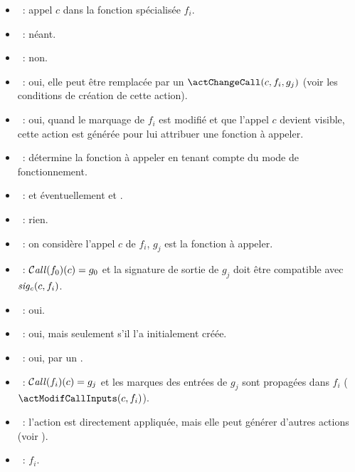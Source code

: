 
\begin{itemize}
  \item \param~: appel $c$ dans la fonction spécialisée $f_i$.
  \item \precond~: néant.
  \item \creable~: non.
  \item \modifiable~: oui, elle peut être remplacée par un $\actChangeCall(c,
    f_i, g_j)$ (voir les conditions de création de cette action).
  \item \generable~: oui, quand le marquage de $f_i$ est modifié et que 
    l'appel $c$ devient visible, cette action est générée pour lui
    attribuer une fonction à appeler.
  \item \application~: détermine la fonction à appeler en tenant compte du mode
    de fonctionnement.
  \item \genere~: \actChangeCall{} et éventuellement \actNewSlice{} et
    \actAddOutputMarks{}.
  \item \modifie~: rien.
\end{itemize}


\begin{itemize}
  \item \param~: on considère l'appel $c$ de $f_i$, $g_j$ est la fonction à
    appeler.
  \item \precond~: $\operatorname{\mathcal{C\mathit{all}}}(f_0)(c)=g_0$ et la signature de sortie de $g_j$
    doit être compatible avec $\mathit{sig_c}(c, f_i)$.
  \item \creable~: oui.
  \item \modifiable~: oui, mais seulement s'il l'a initialement créée.
  \item \generable~: oui, par un \actChooseCall.
  \item \application~: $\operatorname{\mathcal{C\mathit{all}}}(f_i)(c)=g_j$ et les marques des entrées de $g_j$
    sont propagées dans $f_i$ ($\actModifCallInputs(c, f_i)$).
  \item \genere~: l'action \actModifCallInputs{} est directement
    appliquée, mais elle peut générer d'autres actions (voir
    ).
  \item \modifie~: $f_i$.
\end{itemize}



